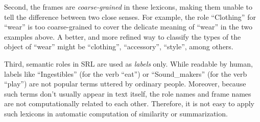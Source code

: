 Second, the frames are {\em coarse-grained}
in these lexicons, making them unable to tell the
difference between two close senses.
For example, the role ``Clothing'' for ``wear'' is
too coarse-grained to cover the delicate meaning of ``wear''
in the two examples above.
A better, and more refined way
to classify the types of the object of ``wear'' might be
``clothing'', ``accessory'', ``style'', among others.

Third, semantic roles in SRL are used as {\em labels} only.
While readable by human, labels like ``Ingestibles''
(for the verb ``eat'') or
``Sound\_makers'' (for the verb ``play'')
are not popular terms uttered by ordinary people.
Moreover, because such terms don't usually appear in text itself,
the role names and frame names are not computationally related to each other.
Therefore, it is not easy to apply such lexicons in automatic computation of
similarity or summarization.

%

